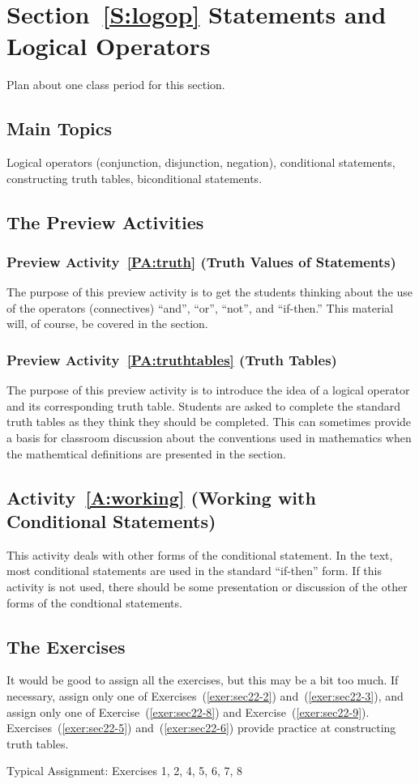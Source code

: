 \section*{Section~\ref{S:logop} Statements and Logical Operators}
Plan about one class period for this section.


\subsection*{Main Topics}
Logical operators (conjunction, disjunction, negation), conditional statements, constructing truth tables, biconditional statements.

\subsection*{The Preview Activities}
\subsubsection*{Preview Activity~\ref{PA:truth} (Truth Values of Statements)} 
The purpose of this preview activity is to get the students thinking about the use of the operators (connectives) ``and'', ``or'', ``not'', and ``if-then.''  This material will, of course, be covered in the section.

\subsubsection*{Preview Activity~\ref{PA:truthtables} (Truth Tables)}  
The purpose of this preview activity is to introduce the idea of a logical operator and its corresponding truth table.  Students are asked to complete the standard truth tables as they think they should be completed.  This can sometimes provide a basis for classroom discussion about the conventions used in mathematics when the mathemtical definitions are presented in the section.
\hbreak

\subsection*{Activity~\ref{A:working} (Working with Conditional Statements)}
This activity deals with other forms of the conditional statement.  In the text, most conditional statements are used in the standard ``if-then'' form.  If this activity is not used, there should be some presentation or discussion of the other forms of the condtional statements.

\hbreak


\subsection*{The Exercises}

It would be good to assign all the exercises, but this may be a bit too much.  If necessary, assign only one of Exercises~(\ref{exer:sec22-2}) and~(\ref{exer:sec22-3}), and assign only one of Exercise~(\ref{exer:sec22-8}) and Exercise~(\ref{exer:sec22-9}).  
Exercises~(\ref{exer:sec22-5}) and~(\ref{exer:sec22-6}) provide practice at constructing truth tables.

\vskip6pt
\noindent
Typical Assignment:  Exercises 1, 2, 4, 5, 6, 7, 8
\hbreak
\endinput
